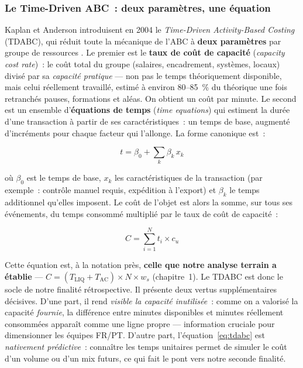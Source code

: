 \subsubsection{Le Time-Driven ABC~: deux paramètres, une équation}

Kaplan et Anderson introduisent en 2004 le \textit{Time-Driven Activity-Based Costing}
(TDABC), qui réduit toute la mécanique de l'ABC à \textbf{deux paramètres} par groupe de
ressources \cite{kaplan2004}. Le premier est le \textbf{taux de coût de capacité}
(\textit{capacity cost rate})~: le coût total du groupe (salaires, encadrement,
systèmes, locaux) divisé par sa \emph{capacité pratique} --- non pas le temps
théoriquement disponible, mais celui réellement travaillé, estimé à environ 80--85~\% du
théorique une fois retranchés pauses, formations et aléas. On obtient un coût par minute.
Le second est un ensemble d'\textbf{équations de temps} (\textit{time equations}) qui
estiment la durée d'une transaction à partir de ses caractéristiques~: un temps de base,
augmenté d'incréments pour chaque facteur qui l'allonge. La forme canonique est~:

\begin{equation}
t = \beta_0 + \sum_{k} \beta_k \, x_k
\label{eq:time-equation}
\end{equation}

\noindent où $\beta_0$ est le temps de base, $x_k$ les caractéristiques de la transaction
(par exemple~: contrôle manuel requis, expédition à l'export) et $\beta_k$ le temps
additionnel qu'elles imposent. Le coût de l'objet est alors la somme, sur tous ses
événements, du temps consommé multiplié par le taux de coût de capacité~:

\begin{equation}
C = \sum_{i=1}^{N} t_i \times c_u
\label{eq:tdabc}
\end{equation}

Cette équation est, à la notation près, \textbf{celle que notre analyse terrain a
établie} --- $C = (T_{\text{LIQ}} + T_{\text{AC}}) \times N \times w_s$ (chapitre~1). Le
TDABC est donc le socle de notre finalité rétrospective. Il présente deux vertus
supplémentaires décisives. D'une part, il rend \emph{visible la capacité inutilisée}~:
comme on a valorisé la capacité \emph{fournie}, la différence entre minutes disponibles
et minutes réellement consommées apparaît comme une ligne propre --- information cruciale
pour dimensionner les équipes FR/PT. D'autre part, l'équation~\ref{eq:tdabc} est
\emph{nativement prédictive}~: connaître les temps unitaires permet de simuler le coût
d'un volume ou d'un mix futurs, ce qui fait le pont vers notre seconde finalité.


